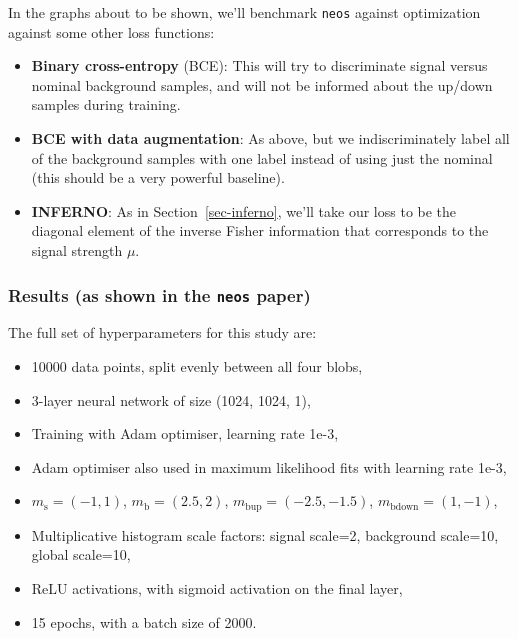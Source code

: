 \documentclass[
  11pt,
  numbers=noendperiod]{book}
\providecommand{\tightlist}{%
  \setlength{\itemsep}{0pt}\setlength{\parskip}{0pt}}\usepackage{longtable,booktabs,array}
\begin{document}
In the graphs about to be shown, we'll benchmark \texttt{neos} against
optimization against some other loss functions:

\begin{itemize}
\tightlist
\item
  \textbf{Binary cross-entropy} (BCE): This will try to discriminate
  signal versus nominal background samples, and will not be informed
  about the up/down samples during training.
\item
  \textbf{BCE with data augmentation}: As above, but we indiscriminately
  label all of the background samples with one label instead of using
  just the nominal (this should be a very powerful baseline).
\item
  \textbf{INFERNO}: As in Section~\ref{sec-inferno}, we'll take our loss
  to be the diagonal element of the inverse Fisher information that
  corresponds to the signal strength \(\mu\).
\end{itemize}

\hypertarget{results-as-shown-in-the-neos-paper}{%
\subsubsection*{\texorpdfstring{Results (as shown in the \texttt{neos}
paper)}{Results (as shown in the neos paper)}}\label{results-as-shown-in-the-neos-paper}}

The full set of hyperparameters for this study are:

\begin{itemize}
\tightlist
\item
  10000 data points, split evenly between all four blobs,
\item
  3-layer neural network of size (1024, 1024, 1),
\item
  Training with Adam optimiser, learning rate 1e-3,
\item
  Adam optimiser also used in maximum likelihood fits with learning rate
  1e-3,
\item
  \(m_\mathrm{s}=(-1, 1)\), \(m_\mathrm{b}=(2.5, 2)\),
  \(m_\mathrm{bup}=(-2.5, -1.5)\), \(m_\mathrm{bdown}=(1, -1)\),
\item
  Multiplicative histogram scale factors: signal scale=2, background
  scale=10, global scale=10,
\item
  ReLU activations, with sigmoid activation on the final layer,
\item
  15 epochs, with a batch size of 2000.
\end{itemize}
\end{document}
